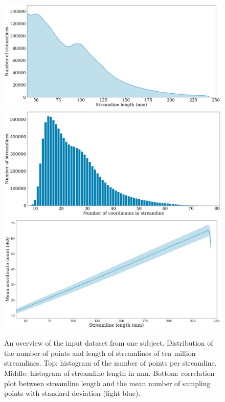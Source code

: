 \begin{figure}[ht]
    \centering
    \includegraphics[width= 13cm]{figures/distribution.png}
    \includegraphics[width= 13cm]{figures/histogram.png}
    \includegraphics[width= 13cm]{figures/length_points.png}
    \caption{An overview of the input dataset from one subject. Distribution of the number of points and length of streamlines of ten million streamlines. 
    Top: histogram of the number of points per streamline. 
    Middle: histogram of streamline length in mm. 
    Bottom: correlation plot between streamline length and the mean number of sampling points with standard deviation (light blue).}
    \label{fig:hist}
\end{figure}

